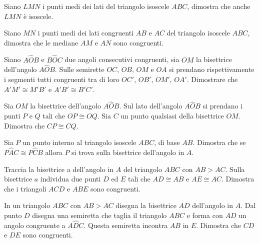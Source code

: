 \begin{multicols}{2}
\begin{esercizio}
\label{ese:2.76}
Siano $LMN$ i punti medi dei lati del triangolo isoscele $ABC$, dimostra che anche $LMN$ è isoscele.
\end{esercizio}

\begin{esercizio}
\label{ese:2.77}
Siano $MN$ i punti medi dei lati congruenti $AB$ e $AC$ del triangolo isoscele $ABC$, dimostra che le mediane $AM$ e $AN$ sono congruenti.
\end{esercizio}

\begin{esercizio}
\label{ese:2.78}
Siano $A\widehat{O}B$ e $B\widehat{O}C$ due angoli consecutivi congruenti, sia $OM$ la bisettrice dell'angolo $A\widehat{O}B$. Sulle semirette $OC$, $OB$, $OM$ e $OA$ si prendano rispettivamente i segmenti tutti congruenti tra di loro $OC'$, $OB'$, $OM'$, $OA'$. Dimostrare che $A'M'\cong M'B'$ e $A'B'\cong B'C'$.
\end{esercizio}

\begin{esercizio}
\label{ese:2.79}
Sia $OM$ la bisettrice dell'angolo $A\widehat{O}B$. Sul lato dell'angolo $A\widehat{O}B$ si prendano i punti $P$ e $Q$ tali che $OP\cong OQ$. Sia $C$ un punto qualsiasi della bisettrice $OM$. Dimostra che $CP\cong CQ$.
\end{esercizio}

\begin{esercizio}
\label{ese:2.80}
Sia $P$ un punto interno al triangolo isoscele $ABC$, di base $AB$. Dimostra che se $P\widehat{A}C\cong P\widehat{C}B$ allora $P$ si trova sulla bisettrice dell'angolo in $A$.
\end{esercizio}

\begin{esercizio}
\label{ese:2.81}
Traccia la bisettrice a dell'angolo in $A$ del triangolo $ABC$ con $AB>AC$. Sulla bisettrice $a$ individua due punti $D$ ed $E$ tali che $AD\cong AB$ e $AE\cong AC$. Dimostra che i triangoli $ACD$ e $ABE$ sono congruenti.
\end{esercizio}

\begin{esercizio}
\label{ese:2.82}
In un triangolo $ABC$ con $AB>AC$ disegna la bisettrice $AD$ dell'angolo in $A$. Dal punto $D$ disegna una semiretta che taglia il triangolo $ABC$ e forma con $AD$ un angolo congruente a $A\widehat{D}C$. Questa semiretta incontra $AB$ in $E$. Dimostra che $CD$ e $DE$ sono congruenti.
\end{esercizio}


\end{multicols}
